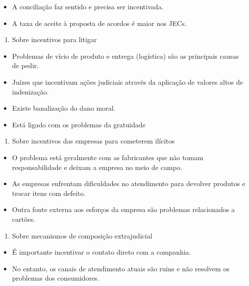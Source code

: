 \documentclass[]{report}
\providecommand{\tightlist}{%
  \setlength{\itemsep}{0pt}\setlength{\parskip}{0pt}}
\begin{document}
\begin{itemize}
\tightlist
\item
  A conciliação faz sentido e precisa ser incentivada.
\item
  A taxa de aceite à proposta de acordos é maior nos JECs.
\end{itemize}

\begin{enumerate}
\def\labelenumi{\arabic{enumi}.}
\tightlist
\item
  Sobre incentivos para litigar
\end{enumerate}

\begin{itemize}
\tightlist
\item
  Problemas de vício de produto e entrega (logística) são as principais
  causas de pedir.
\item
  Juízes que incentivam ações judiciais através da aplicação de valores
  altos de indenização.
\item
  Existe banalização do dano moral.
\item
  Está ligado com os problemas da gratuidade
\end{itemize}

\begin{enumerate}
\def\labelenumi{\arabic{enumi}.}
\tightlist
\item
  Sobre incentivos das empresas para cometerem ilícitos
\end{enumerate}

\begin{itemize}
\tightlist
\item
  O problema está geralmente com as fabricantes que não tomam
  responsabilidade e deixam a empresa no meio de campo.
\item
  As empresas enfrentam dificuldades no atendimento para devolver
  produtos e trocar itens com defeito.
\item
  Outra fonte externa aos esforços da empresa são problemas relacionados
  a cartões.
\end{itemize}

\begin{enumerate}
\def\labelenumi{\arabic{enumi}.}
\tightlist
\item
  Sobre mecanismos de composição extrajudicial
\end{enumerate}

\begin{itemize}
\tightlist
\item
  É importante incentivar o contato direto com a companhia.
\item
  No entanto, os canais de atendimento atuais são ruins e não resolvem
  os problemas dos consumidores.
\end{itemize}
\end{document}
